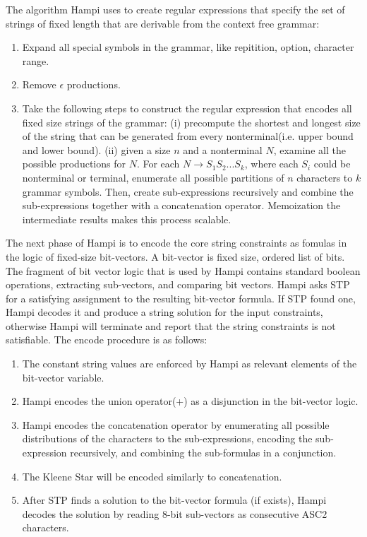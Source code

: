 The algorithm Hampi uses to create regular expressions that specify the set of strings of fixed length that are derivable from the context free grammar:
\begin{enumerate}
	\item Expand all special symbols in the grammar, like repitition, option, character range.
	\item Remove $\epsilon$ productions.
	\item Take the following steps to construct the regular expression that encodes all fixed size strings of the grammar: (i) precompute the shortest and longest size of the string that can be generated from every nonterminal(i.e. upper bound and lower bound). (ii) given a size $n$ and a nonterminal $N$, examine all the possible productions for $N$. For each $N\rightarrow S_1S_2...S_k$, where each $S_i$ could be nonterminal or terminal, enumerate all possible partitions of $n$ characters to $k$ grammar symbols. Then, create sub-expressions recursively and combine the sub-expressions together with a concatenation operator. Memoization the intermediate results makes this process scalable. 
\end{enumerate}   
The next phase of Hampi is to encode the core string constraints as fomulas in the logic of fixed-size bit-vectors. A bit-vector is fixed size, ordered list of bits. The fragment of bit vector logic that is used by Hampi contains standard boolean operations, extracting sub-vectors, and comparing bit vectors. Hampi asks STP for a satisfying assignment to the resulting bit-vector formula. If STP found one, Hampi decodes it and produce a string solution for the input constraints, otherwise Hampi will terminate and report that the string constraints is not satisfiable. The encode procedure is as follows:
\begin{enumerate}
	\item The constant string values are enforced by Hampi as relevant elements of the bit-vector variable.
	\item Hampi encodes the union operator(+) as a disjunction in the bit-vector logic.
	\item Hampi encodes the concatenation operator by enumerating all possible distributions of the characters to the sub-expressions, encoding the sub-expression recursively, and combining the sub-formulas in a conjunction.
	\item The Kleene Star will be encoded similarly to concatenation.
	\item After STP finds a solution to the bit-vector formula (if exists), Hampi decodes the solution by reading 8-bit sub-vectors as consecutive ASC2 characters.
	 

\end{enumerate}